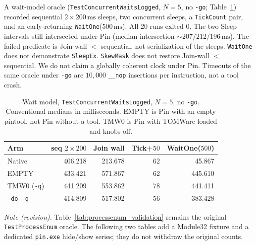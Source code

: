 A wait-model oracle (\texttt{TestConcurrentWaitsLogged}, $N=5$, no \texttt{-go}; Table~\ref{tab:wait_model_n5}) recorded sequential $2\times 200\,\mathrm{ms}$ sleeps, two concurrent sleeps, a \texttt{TickCount} pair, and an early-returning \texttt{WaitOne}($500\,\mathrm{ms}$). All 20 runs exited 0. The two Sleep intervals still intersected under Pin (median intersection $\sim 207/212/196\,\mathrm{ms}$). The failed predicate is Join-wall $<$ sequential, not serialization of the sleeps. \texttt{WaitOne} does not demonstrate \texttt{SleepEx}. \texttt{SkewMask} does not restore Join-wall $<$ sequential. We do not claim a globally coherent clock under Pin. Timeouts of the same oracle under \texttt{-go} are $10{,}000$ \texttt{\_\_nop} insertions per instruction, not a tool crash.

\begin{table}[t]
\caption{Wait model, \texttt{TestConcurrentWaitsLogged}, $N=5$, no \texttt{-go}. Conventional medians in milliseconds. EMPTY is Pin with an empty pintool, not Pin without a tool. TMW0 is Pin with TOMWare loaded and knobs off.}
\label{tab:wait_model_n5}
\centering
\small
\begin{tabular}{lrrrr}
\toprule
\textbf{Arm} & \textbf{seq $2\times200$} & \textbf{Join wall} & \textbf{Tick+$50$} & \textbf{WaitOne($500$)} \\
\midrule
Native & 406.218 & 213.678 & 62 & 45.867 \\
EMPTY & 433.421 & 571.867 & 62 & 445.610 \\
TMW0 (\texttt{-q}) & 441.209 & 553.862 & 78 & 441.411 \\
\texttt{-do -q} & 414.809 & 517.802 & 56 & 383.428 \\
\bottomrule
\end{tabular}
\end{table}


\textit{Note (revision).} Table~\ref{tab:processenum_validation} remains the original \texttt{TestProcessEnum} oracle. The following two tables add a Module32 fixture and a dedicated \texttt{pin.exe} hide/show series; they do not withdraw the original counts.


